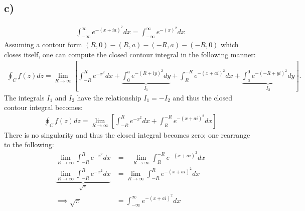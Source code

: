 \documentclass{article}
\begin{document}
\subsection*{c)}
\begin{align*}
    \int_{-\infty}^\infty e^{-(x + ia)^2}dx = \int_{-\infty}^\infty e^{-(x)^2}dx
\end{align*}
Assuming a contour form $(R,0)-(R,a)-(-R, a)-(-R,0)$ which closes itself, one can compute the closed contour integral in the following manner:
\begin{align*}
    \oint_C f(z)dz = \lim_{R\to\infty}\left[\int_{-R}^{R}e^{-x^2}dx + \underbrace{\int_0^{a}e^{-(R+iy)^2}dy}_{I_1} + \int_R^{-R}e^{-(x + ai)^2}dx+\underbrace{\int_{a}^{0}e^{-(-R+yi)^2}dy}_{I_2}\right].
\end{align*}The integrals $I_1$ and $I_2$ have the relationship $I_1 = -I_2$ and thus the closed contour integral becomes:
\begin{align*}
    \oint_C f(z)dz = \lim_{R\to\infty}\left[\int_{-R}^{R}e^{-x^2}dx + \int_R^{-R}e^{-(x + ai)^2}dx  \right]
\end{align*}There is no singularity and thus the closed integral becomes zero; one rearrange to the following:
\begin{align*}
    \lim_{R\to\infty} \int_{-R}^{R}e^{-x^2}dx &= -\lim_{R\to\infty}\int_R^{-R}e^{-(x + ai)^2}dx\\
    \underbrace{\lim_{R\to\infty} \int_{-R}^{R}e^{-x^2}dx}_{\sqrt{\pi}} &= \lim_{R\to\infty}\int_{-R}^{R}e^{-(x + ai)^2}dx\\
    \implies \sqrt{\pi} &= \int_{-\infty}^{\infty}e^{-(x + ai)^2}dx\\
\end{align*}
\end{document}
